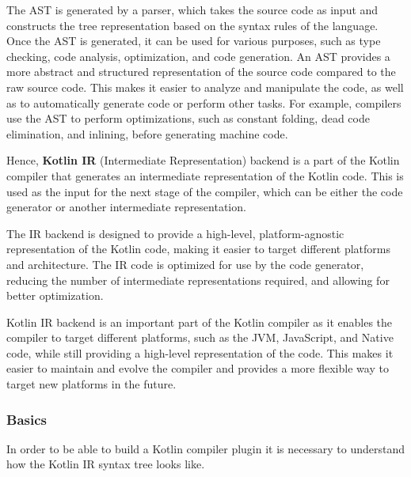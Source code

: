 The AST is generated by a parser, which takes the source code as input and constructs the tree representation based on the syntax rules of the language. Once the AST is generated, it can be used for various purposes, such as type checking, code analysis, optimization, and code generation.\newline
An AST provides a more abstract and structured representation of the source code compared to the raw source code. This makes it easier to analyze and manipulate the code, as well as to automatically generate code or perform other tasks. For example, compilers use the AST to perform optimizations, such as constant folding, dead code elimination, and inlining, before generating machine code.

Hence, \textbf{Kotlin IR} (Intermediate Representation) backend is a part of the Kotlin compiler that generates an intermediate representation of the Kotlin code. This is used as the input for the next stage of the compiler, which can be either the code generator or another intermediate representation.

The IR backend is designed to provide a high-level, platform-agnostic representation of the Kotlin code, making it easier to target different platforms and architecture. The IR code is optimized for use by the code generator, reducing the number of intermediate representations required, and allowing for better optimization.

Kotlin IR backend is an important part of the Kotlin compiler as it enables the compiler to target different platforms, such as the JVM, JavaScript, and Native code, while still providing a high-level representation of the code. This makes it easier to maintain and evolve the compiler and provides a more flexible way to target new platforms in the future.

\subsubsection{Basics}\label{section:compiler_plugin_basics}
In order to be able to build a Kotlin compiler plugin it is necessary to understand how the Kotlin IR syntax tree looks like.

